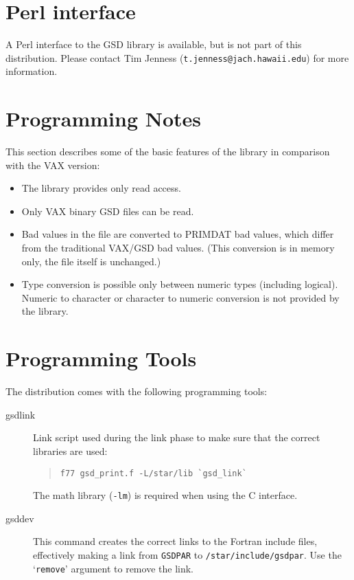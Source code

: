 \documentclass[twoside,11pt]{article}
\renewcommand{\_}{\texttt{\symbol{95}}}
\begin{document}
\section{Perl interface}

A Perl interface to the GSD library is available, but is not part of this
distribution. Please contact Tim Jenness (\texttt{t.jenness@jach.hawaii.edu})
for more information.

\section{Programming Notes}

This section describes some of the basic features of the library in
comparison with the VAX version:

\begin{itemize}
\item The library provides only read access.

\item Only VAX binary GSD files can be read.

\item Bad values in the file are converted to PRIMDAT bad
values\cite{primdat}, which differ from the traditional VAX/GSD bad
values. (This conversion is in memory only, the file itself is unchanged.)

\item Type conversion is possible only between numeric types (including
logical). Numeric to character or character to numeric conversion is not
provided by the library.

\end{itemize}

\section{Programming Tools}

The distribution comes with the following programming tools:

\begin{description}
\item[gsd\_link] \mbox{}

Link script used during the link phase to make sure that the correct
libraries are used:
\begin{quote}
\begin{verbatim}
f77 gsd_print.f -L/star/lib `gsd_link`
\end{verbatim}
\end{quote}

The math library (\texttt{-lm}) is required when using the C interface.

\item[gsd\_dev] \mbox{}

This command creates the correct links to the Fortran include files,
effectively making a link from \texttt{GSD\_PAR} to
\texttt{/star/include/gsd\_par}.
Use the `\texttt{remove}' argument to remove the link.

\end{description}
\end{document}
